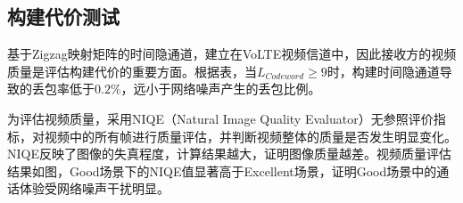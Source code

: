 \subsection{构建代价测试}
\label{chap:zigzag:results:cost}


基于Zigzag映射矩阵的时间隐通道，建立在VoLTE视频信道中，因此接收方的视频质量是评估构建代价的重要方面。根据表，当$L_{Codeword}\ge 9$时，构建时间隐通道导致的丢包率低于$0.2\%$，远小于网络噪声产生的丢包比例。

为评估视频质量，采用NIQE（Natural Image Quality Evaluator）无参照评价指标，对视频中的所有帧进行质量评估，并判断视频整体的质量是否发生明显变化。NIQE反映了图像的失真程度，计算结果越大，证明图像质量越差。视频质量评估结果如图，Good场景下的NIQE值显著高于Excellent场景，证明Good场景中的通话体验受网络噪声干扰明显。

